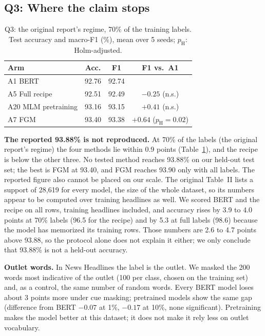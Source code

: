 \documentclass[conference]{IEEEtran}
\newcommand{\A}[1]{\textsf{#1}}                         %
\begin{document}
\subsection{Q3: Where the claim stops}

\begin{table}[t]
\centering
\caption{Q3: the original report's regime, 70\% of the training labels. Test accuracy and macro-F1 (\%), mean over 5 seeds; $p_{\mathrm{H}}$: Holm-adjusted.}
\label{tab:seven}
\footnotesize
\setlength{\tabcolsep}{5pt}
\begin{tabular}{lccc}
\toprule
Arm & Acc. & F1 & F1 vs.\ \A{A1} \\
\midrule
\A{A1} BERT & 92.76 & 92.74 & \\
\A{A5} Full recipe & 92.51 & 92.49 & $-0.25$ (n.s.) \\
\A{A20} MLM pretraining & 93.16 & 93.15 & $+0.41$ (n.s.) \\
\A{A7} FGM & 93.40 & 93.38 & $+0.64$ ($p_{\mathrm{H}}{=}0.02$) \\
\bottomrule
\end{tabular}
\end{table}

\textbf{The reported 93.88\% is not reproduced.} At 70\% of the labels (the original report's regime) the four methods lie within 0.9 points (Table~\ref{tab:seven}), and the recipe is below the other three. No tested method reaches 93.88\% on our held-out test set; the best is FGM at 93.40, and FGM reaches 93.90 only with all labels. The reported figure also cannot be placed on our scale. The original Table~II lists a support of 28,619 for every model, the size of the whole dataset, so its numbers appear to be computed over training headlines as well. We scored BERT and the recipe on all rows, training headlines included, and accuracy rises by 3.9 to 4.0 points at 70\% labels (96.5 for the recipe) and by 5.3 at full labels (98.6) because the model has memorized its training rows. Those numbers are 2.6 to 4.7 points above 93.88, so the protocol alone does not explain it either; we only conclude that 93.88\% is not a held-out accuracy.

\textbf{Outlet words.} In News Headlines the label is the outlet. We masked the 200 words most indicative of the outlet (100 per class, chosen on the training set) and, as a control, the same number of random words. Every BERT model loses about 3 points more under cue masking; pretrained models show the same gap (difference from BERT $-0.07$ at 1\%, $-0.17$ at 10\%, none significant). Pretraining makes the model better at this dataset; it does not make it rely less on outlet vocabulary.
\end{document}
